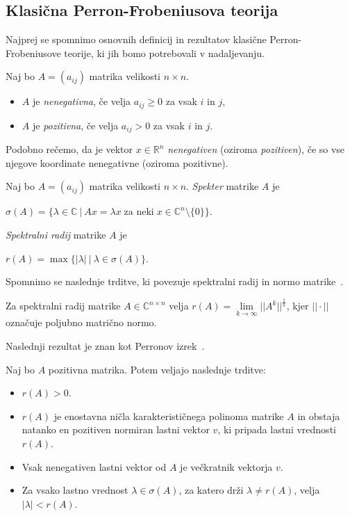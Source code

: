 \documentclass[mat2, tisk]{fmfdelo}
\newcommand{\R}{\mathbb{R}}
\newcommand{\C}{\mathbb{C}}
\begin{document}
\subsection{Klasična Perron-Frobeniusova teorija}

Najprej se spomnimo osnovnih definicij in rezultatov
klasične Perron-Frobeniusove teorije, ki jih bomo
potrebovali v nadaljevanju.

\begin{definicija}
  Naj bo $A = (a_{ij})$ matrika velikosti $n \times n$.
  \begin{itemize}
    \item $A$ je \emph{nenegativna}, če velja $a_{ij} \geq 0$ za vsak $i$ in $j$,
    \item $A$ je \emph{pozitivna}, če velja $a_{ij} > 0$ za vsak $i$ in $j$.
  \end{itemize}
\end{definicija}

Podobno rečemo, da je vektor $x \in \R^n$ \emph{nenegativen} (oziroma \emph{pozitiven}), 
če so vse njegove koordinate nenegativne (oziroma pozitivne). 

\begin{definicija}
  Naj bo $A = (a_{ij})$ matrika velikosti $n \times n$. 
  \emph{Spekter} matrike $A$ je
  \begin{center}
    $\sigma(A) = \{ \lambda \in \C ~|~ Ax = \lambda x \; \text{za neki} \; x \in \C^n \setminus \{0\} \}$.
  \end{center}

  \emph{Spektralni radij} matrike $A$ je 
  \begin{center}
    $r(A) = \max\{ |\lambda | ~|~ \lambda \in \sigma(A) \}$.
  \end{center}
\end{definicija}

Spomnimo se naslednje trditve, ki povezuje spektralni radij in normo matrike~\cite{Ciarlet2025}.
\begin{trditev}
  Za spektralni radij matrike $A \in \C ^ {n \times n}$ velja
  $r(A) = \lim\limits_{k \rightarrow \infty} || A^k ||^{\frac{1}{k}} $, kjer $|| \cdot ||$ 
  označuje poljubno matrično normo.
\end{trditev} 

Naslednji rezultat je znan kot Perronov izrek~\cite{Perron1907}.

\begin{trditev}[Perron]\label{trd:perron}
  Naj bo $A$ pozitivna matrika. Potem veljajo naslednje trditve:
  \begin{itemize}
    \item $r(A) > 0$.
    \item $r(A)$ je enostavna ničla karakterističnega polinoma matrike $A$ in 
          obstaja natanko en pozitiven normiran lastni vektor $v$, ki pripada
          lastni vrednosti $r(A)$.
    \item Vsak nenegativen lastni vektor od $A$ je večkratnik vektorja $v$.
    \item Za vsako lastno vrednost $\lambda \in \sigma(A)$, za katero 
          drži $\lambda \neq r(A)$, velja $|\lambda| < r(A)$.
  \end{itemize}
\end{trditev}
\end{document}
